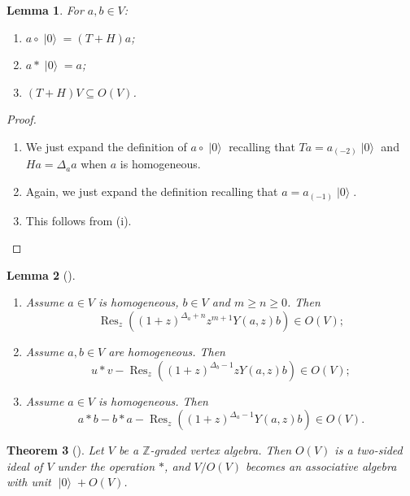 \documentclass[a4paper, 12pt, reqno]{amsart}
\newtheorem{theorem}{Theorem}[section]
\newtheorem{lemma}[theorem]{Lemma}
\theoremstyle{remark}
\numberwithin{equation}{subsection}
\DeclareMathOperator{\Res}{Res}
\DeclareMathOperator{\vac}{|0\rangle}
\begin{document}
\begin{lemma}
  \label{lmm:19}
  For $a, b \in V$:
  \begin{enumerate}
  \item $a\circ\vac = (T + H)a$;
  \item $a*\vac = a$;
  \item $(T + H)V \subseteq O(V)$.
  \end{enumerate}
\end{lemma}

\begin{proof}\leavevmode
  \begin{enumerate}
  \item We just expand the definition of $a\circ\vac$ recalling that $Ta = a_{(-2)}\vac$ and $Ha = \Delta_aa$ when $a$ is homogeneous.
  \item Again, we just expand the definition recalling that $a = a_{(-1)}\vac$.
  \item This follows from (i). \qedhere
  \end{enumerate}
\end{proof}

\begin{lemma}[{\cite[Lemma 2.2]{dong_twisted_1998}}]\leavevmode
  \label{lmm:20}
  \begin{enumerate}
  \item Assume $a \in V$ is homogeneous, $b \in V$ and $m \ge n \ge 0$.
    Then
    \begin{equation*}
      \Res_z\left((1 + z)^{\Delta_a + n}{z^{m + 1}}Y(a, z)b\right) \in O(V);
    \end{equation*}
  \item Assume $a, b \in V$ are homogeneous.
    Then
    \begin{equation*}
      u*v - \Res_z\left((1 + z)^{\Delta_b - 1}{z}Y(a, z)b\right) \in O(V);
    \end{equation*}
  \item Assume $a \in V$ is homogeneous.
    Then
    \begin{equation*}
      a*b - b*a - \Res_z((1 + z)^{\Delta_a - 1}Y(a, z)b) \in O(V).
    \end{equation*}
  \end{enumerate}
\end{lemma}

\begin{theorem}[{\cite[Proposition 2.3 and Theorem 2.4]{dong_twisted_1998}}]
  \label{thr:34}
  Let $V$ be a $\mathbb{Z}$-graded vertex algebra.
  Then $O(V)$ is a two-sided ideal of $V$ under the operation $*$, and $V/O(V)$ becomes an associative algebra with unit $\vac + O(V)$.
\end{theorem}
\end{document}
